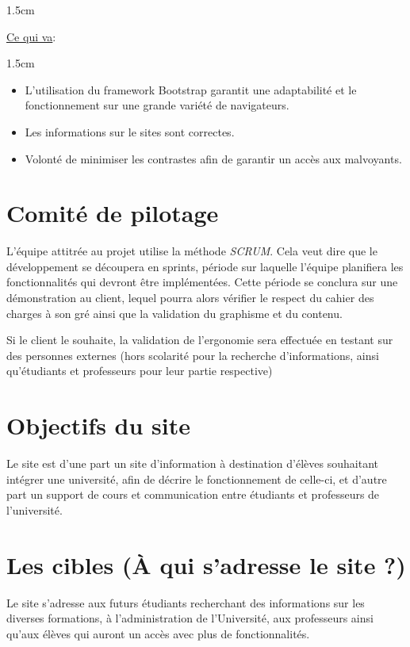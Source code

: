 \documentclass[oneside]{report}
\newcommand{\indentunder}{1.5cm}
\begin{document}
{\begin{adjustwidth}{\indentunder}{}
		\end{adjustwidth}
	\vspace{1cm}
	\par\underline{Ce qui va}:
		\vspace{.5cm}
		\begin{adjustwidth}{\indentunder}{}
		\begin{itemize}
			\item L'utilisation du framework Bootstrap garantit une adaptabilité et le fonctionnement sur une grande variété de navigateurs.
			\item Les informations sur le sites sont correctes.
			\item Volonté de minimiser les contrastes afin de garantir un accès aux malvoyants.
		\end{itemize}
		\end{adjustwidth}
\newpage
		\section{Comité de pilotage}
		{
			\par L’équipe attitrée au projet utilise la méthode \textit{SCRUM}. Cela veut dire que le développement se découpera en sprints, période sur laquelle l’équipe planifiera les fonctionnalités qui devront être implémentées. Cette période se conclura sur une démonstration au client, lequel pourra alors vérifier le respect du cahier des charges à son gré ainsi que la validation du graphisme et du contenu.
			\vspace{.5cm}
			\par Si le client le souhaite, la validation de l’ergonomie sera effectuée en testant sur des personnes externes (hors scolarité pour la recherche d’informations, ainsi qu’étudiants et professeurs pour leur partie respective)

		}
		\section{Objectifs du site}
		{
			Le site est d’une part un site d’information à destination d’élèves souhaitant intégrer une université, afin de décrire le fonctionnement de celle-ci, et d'autre part un support de cours et communication entre étudiants et professeurs de l’université.
		}
		
		\section{Les cibles (À qui s'adresse le site ?)}
		\par Le site s'adresse aux futurs étudiants recherchant des informations sur les diverses formations, à l'administration de l'Université, aux professeurs ainsi qu'aux élèves qui auront un accès avec plus de fonctionnalités.

}
\end{document}
